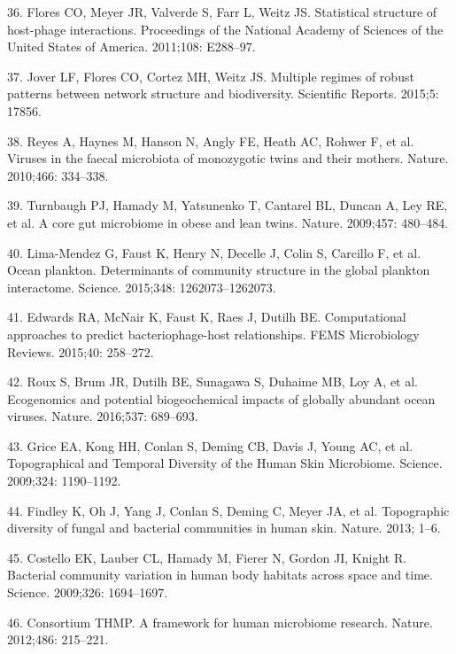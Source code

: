 \documentclass[12pt,]{article}
\begin{document}
\hypertarget{ref-Flores:2011bh}{}
36. Flores CO, Meyer JR, Valverde S, Farr L, Weitz JS. Statistical
structure of host-phage interactions. Proceedings of the National
Academy of Sciences of the United States of America. 2011;108: E288--97.

\hypertarget{ref-Jover:2015ev}{}
37. Jover LF, Flores CO, Cortez MH, Weitz JS. Multiple regimes of robust
patterns between network structure and biodiversity. Scientific Reports.
2015;5: 17856.

\hypertarget{ref-Reyes:2010cwa}{}
38. Reyes A, Haynes M, Hanson N, Angly FE, Heath AC, Rohwer F, et al.
Viruses in the faecal microbiota of monozygotic twins and their mothers.
Nature. 2010;466: 334--338.

\hypertarget{ref-Turnbaugh:2009ei}{}
39. Turnbaugh PJ, Hamady M, Yatsunenko T, Cantarel BL, Duncan A, Ley RE,
et al. A core gut microbiome in obese and lean twins. Nature. 2009;457:
480--484.

\hypertarget{ref-LimaMendez:2015hw}{}
40. Lima-Mendez G, Faust K, Henry N, Decelle J, Colin S, Carcillo F, et
al. Ocean plankton. Determinants of community structure in the global
plankton interactome. Science. 2015;348: 1262073--1262073.

\hypertarget{ref-Edwards:2015iz}{}
41. Edwards RA, McNair K, Faust K, Raes J, Dutilh BE. Computational
approaches to predict bacteriophage-host relationships. FEMS
Microbiology Reviews. 2015;40: 258--272.

\hypertarget{ref-Roux:2016cc}{}
42. Roux S, Brum JR, Dutilh BE, Sunagawa S, Duhaime MB, Loy A, et al.
Ecogenomics and potential biogeochemical impacts of globally abundant
ocean viruses. Nature. 2016;537: 689--693.

\hypertarget{ref-Grice:2009eea}{}
43. Grice EA, Kong HH, Conlan S, Deming CB, Davis J, Young AC, et al.
Topographical and Temporal Diversity of the Human Skin Microbiome.
Science. 2009;324: 1190--1192.

\hypertarget{ref-Findley:2013jf}{}
44. Findley K, Oh J, Yang J, Conlan S, Deming C, Meyer JA, et al.
Topographic diversity of fungal and bacterial communities in human skin.
Nature. 2013; 1--6.

\hypertarget{ref-Costello:2009im}{}
45. Costello EK, Lauber CL, Hamady M, Fierer N, Gordon JI, Knight R.
Bacterial community variation in human body habitats across space and
time. Science. 2009;326: 1694--1697.

\hypertarget{ref-Consortium:2012iz}{}
46. Consortium THMP. A framework for human microbiome research. Nature.
2012;486: 215--221.
\end{document}
